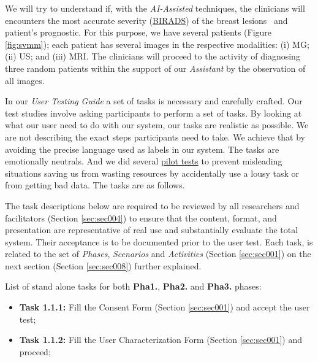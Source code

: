 \hfill


We will try to understand if, with the \textit{AI-Assisted} techniques, the clinicians will encounters the most accurate severity (\hyperlink{https://en.wikipedia.org/wiki/BI-RADS}{BIRADS}) of the breast lesions~\cite{american1998breast} and patient's prognostic. For this purpose, we have several patients (Figure \ref{fig:svmm}); each patient has several images in the respective modalities: (i) \gls{MG}; (ii) \gls{US}; and (iii) \gls{MRI}. The clinicians will proceed to the activity of diagnosing three random patients within the support of our \textit{Assistant} by the observation of all images.

\hfill

In our \textit{User Testing Guide} a set of tasks is necessary and carefully crafted. Our test studies involve asking participants to perform a set of tasks. By looking at what our user need to do with our system, our tasks are realistic as possible. We are not describing the exact steps participants need to take. We achieve that by avoiding the precise language used as labels in our system. The tasks are emotionally neutrals. And we did several \hyperlink{https://www.nngroup.com/articles/pilot-testing/}{pilot tests} to prevent misleading situations saving us from wasting resources by accidentally use a lousy task or from getting bad data. The tasks are as follows.

The task descriptions below are required to be reviewed by all researchers and facilitators (Section \ref{sec:sec004}) to ensure that the content, format, and presentation are representative of real use and substantially evaluate the total system. Their acceptance is to be documented prior to the user test. Each task, is related to the set of {\it Phases}, {\it Scenarios} and {\it Activities} (Section \ref{sec:sec001}) on the next section (Section \ref{sec:sec008}) further explained.

\clearpage


List of stand alone tasks for both {\bf Pha1.}, {\bf Pha2.} and {\bf Pha3.} phases:


\hfill

\begin{itemize}
\item[] \textbf{Task 1.1.1:} Fill the Consent Form (Section \ref{sec:sec001}) and accept the user test;
\item[] \textbf{Task 1.1.2:} Fill the User Characterization Form (Section \ref{sec:sec001}) and proceed;
\end{itemize}

